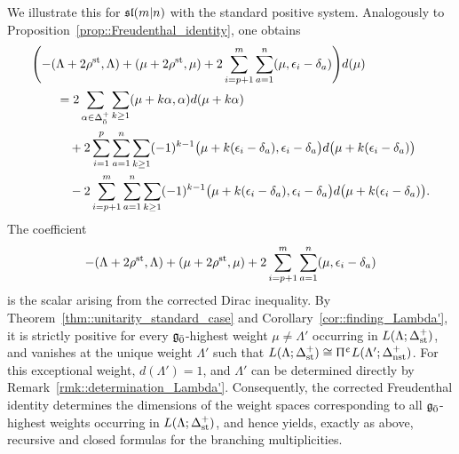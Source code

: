 We illustrate this for ${\mathfrak{sl}(m\vert n)}$ with the standard positive system.
Analogously to Proposition~\ref{prop::Freudenthal_identity}, one obtains
\begin{equation}
\begin{aligned}
&\Biggl(
-(\Lambda+2\rho^{{\text{st}}},\Lambda)
+(\mu+2\rho^{{\text{st}}},\mu)
+2\sum_{i=p+1}^{m}\sum_{a=1}^{n}
(\mu,\epsilon_i-\delta_a)
\Biggr)d(\mu)
\\
&\qquad=
2\sum_{\alpha\in\Delta_{\bar0}^{+}}\sum_{k\ge1}
(\mu+k\alpha,\alpha)d(\mu+k\alpha)
\\
&\qquad\quad
+2\sum_{i=1}^{p}\sum_{a=1}^{n}\sum_{k\ge1}
(-1)^{k-1}
\bigl(\mu+k(\epsilon_i-\delta_a),\epsilon_i-\delta_a\bigr)
d\bigl(\mu+k(\epsilon_i-\delta_a)\bigr)
\\
&\qquad\quad
-2\sum_{i=p+1}^{m}\sum_{a=1}^{n}\sum_{k\ge1}
(-1)^{k-1}
\bigl(\mu+k(\epsilon_i-\delta_a),\epsilon_i-\delta_a\bigr)
d\bigl(\mu+k(\epsilon_i-\delta_a)\bigr).
\end{aligned}
\end{equation}
The coefficient
\begin{equation}\label{eq::corrected_Dirac_inequality_slmn}
-(\Lambda+2\rho^{{\text{st}}},\Lambda)
+(\mu+2\rho^{{\text{st}}},\mu)
+2\sum_{i=p+1}^{m}\sum_{a=1}^{n}
(\mu,\epsilon_i-\delta_a)
\end{equation}
is the scalar arising from the corrected Dirac inequality. By
Theorem~\ref{thm::unitarity_standard_case} and Corollary~\ref{cor::finding_Lambda'}, it is strictly positive
for every ${\mathfrak{g}_{\bar{0}}}$-highest weight $\mu\neq\Lambda'$ occurring in
$L(\Lambda;\Delta_{{\text{st}}}^{+})$, and vanishes at the unique weight $\Lambda'$
such that
$L(\Lambda;\Delta_{{\text{st}}}^{+})\cong
 \Uppi^{\upepsilon}L(\Lambda';\Delta_{{\text{nst}}}^{+})$.
For this exceptional weight, $d(\Lambda')=1$, and $\Lambda'$ can be
determined directly by Remark~\ref{rmk::determination_Lambda'}.
Consequently, the corrected Freudenthal identity determines the dimensions
of the weight spaces corresponding to all ${\mathfrak{g}_{\bar{0}}}$-highest weights occurring
in $L(\Lambda;\Delta_{{\text{st}}}^{+})$, and hence yields, exactly as above,
recursive and closed formulas for the branching multiplicities.
